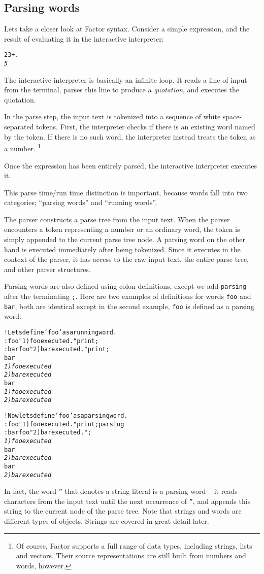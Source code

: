 \documentclass[english]{article}
\begin{document}
\subsection{Parsing words}

Lets take a closer look at Factor syntax. Consider a simple expression,
and the result of evaluating it in the interactive interpreter:

\begin{alltt}
2 3 + .
\emph{5}
\end{alltt}
The interactive interpreter is basically an infinite loop. It reads
a line of input from the terminal, parses this line to produce a \emph{quotation},
and executes the quotation.

In the parse step, the input text is tokenized into a sequence of
white space-separated tokens. First, the interpreter checks if there
is an existing word named by the token. If there is no such word,
the interpreter instead treats the token as a number.%
\footnote{Of course, Factor supports a full range of data types, including strings,
lists and vectors. Their source representations are still built from
numbers and words, however.%
}

Once the expression has been entirely parsed, the interactive interpreter
executes it.

This parse time/run time distinction is important, because words fall
into two categories; {}``parsing words'' and {}``running words''.

The parser constructs a parse tree from the input text. When the parser
encounters a token representing a number or an ordinary word, the
token is simply appended to the current parse tree node. A parsing
word on the other hand is executed \emph{}immediately after being
tokenized. Since it executes in the context of the parser, it has
access to the raw input text, the entire parse tree, and other parser
structures.

Parsing words are also defined using colon definitions, except we
add \texttt{parsing} after the terminating \texttt{;}. Here are two
examples of definitions for words \texttt{foo} and \texttt{bar}, both
are identical except in the second example, \texttt{foo} is defined
as a parsing word:

\begin{alltt}
! Lets define 'foo' as a running word.
: foo "1) foo executed." print ;
: bar foo "2) bar executed." print ;
bar
\emph{1) foo executed}
\emph{2) bar executed}
bar
\emph{1) foo executed}
\emph{2) bar executed}

! Now lets define 'foo' as a parsing word.
: foo "1) foo executed." print ; parsing
: bar foo "2) bar executed." ;
\emph{1) foo executed}
bar
\emph{2) bar executed}
bar
\emph{2) bar executed}
\end{alltt}
In fact, the word \texttt{{}''} that denotes a string literal is
a parsing word -- it reads characters from the input text until the
next occurrence of \texttt{{}''}, and appends this string to the
current node of the parse tree. Note that strings and words are different
types of objects. Strings are covered in great detail later.
\end{document}
